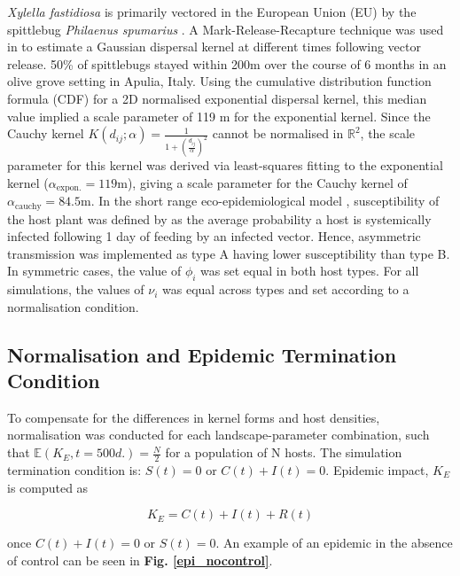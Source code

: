 \documentclass[11pt,letterpaper]{article}
\begin{document}
\emph{Xylella fastidiosa} is primarily vectored in the European Union (EU) by the spittlebug \emph{Philaenus spumarius} \cite{Bragard2019, Bodino2021}. A Mark-Release-Recapture technique was used in \cite{Bodino2021} to estimate a Gaussian dispersal kernel at different times following vector release. 50\% of spittlebugs stayed within 200m over the course of 6 months in an olive grove setting in Apulia, Italy. Using the cumulative distribution function formula (CDF) for a 2D normalised exponential dispersal kernel, this median value implied a scale parameter of 119 m for the exponential kernel. Since the Cauchy kernel $K(d_{ij}; \alpha) = \frac{1}{1+\left(\frac{d_{ij}} {\alpha}\right)^2}$ cannot be normalised in $\mathbb{R}^2$, the scale parameter for this kernel was derived via least-squares fitting to the exponential kernel ($\alpha_{\mathrm{expon.}}=119$m), giving a scale parameter for the Cauchy kernel of $\alpha_{\mathrm{cauchy}}= 84.5$m.
In the short range eco-epidemiological model \cite{Bragard2019}, susceptibility of the host plant was defined by as the average probability a host is systemically infected following 1 day of feeding by an infected vector. Hence, asymmetric transmission was implemented as type A having lower susceptibility than type B. In symmetric cases, the value of $\phi_{i}$ was set equal in both host types. For all simulations, the values of $\nu_{i}$ was equal across types and set according to a normalisation condition.
\FloatBarrier
\subsection*{Normalisation and Epidemic Termination Condition}

To compensate for the differences in kernel forms and host densities, normalisation was conducted for each landscape-parameter combination, such that $\mathbb{E}(K_E, t = 500 d.) = \frac{N}{2}$ for a population of N hosts.
The simulation termination condition is: $S(t) = 0$ or $C(t) + I(t) = 0$. Epidemic impact, $K_{E}$ is computed as 

\begin{equation}
    K_{E} = C(t) + I(t) + R(t)
\end{equation}

once $C(t) + I(t) = 0 $ or $ S(t) = 0$. An example of an epidemic in the absence of control can be seen in \textbf{Fig. \ref{epi_nocontrol}}.
\end{document}
